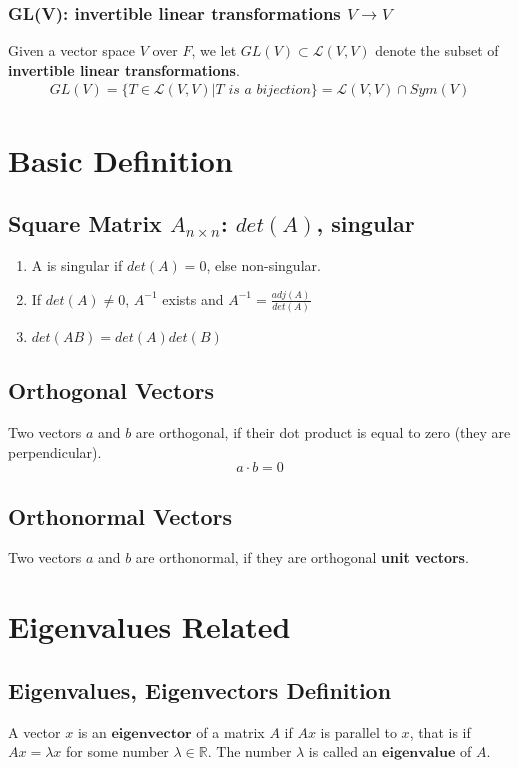 \documentclass[11pt]{elegantbook}
\begin{document}
\subsection{GL(V): invertible linear transformations $V \rightarrow	V$}
Given a vector space $V$ over $F$, we let $GL(V ) \subset \mathcal{L}(V, V )$ denote the subset of \textbf{invertible linear transformations}.
\begin{equation}
    \begin{aligned}
        GL(V)=\{T\in \mathcal{L}(V, V )| T \textit{ is a bijection}\}=\mathcal{L}(V, V )\cap Sym(V)
    \end{aligned}
    \nonumber
\end{equation}

\chapter{Basic Definition}
\section{Square Matrix $A_{n\times n}$: $det(A)$, singular}
\begin{enumerate}
    \item A is singular if $det(A)=0$, else non-singular.
    \item If $det(A)\neq 0$, $A^{-1}$ exists and $A^{-1}=\frac{adj(A)}{det(A)}$
    \item $det(AB)=det(A)det(B)$
\end{enumerate}

\section{Orthogonal Vectors}
Two vectors $a$ and $b$ are orthogonal, if their dot product is equal to zero (they are perpendicular). $$a\cdot b=0$$

\section{Orthonormal Vectors}
Two vectors $a$ and $b$ are orthonormal, if they are orthogonal \textbf{unit vectors}.





\chapter{Eigenvalues Related}
\section{Eigenvalues, Eigenvectors Definition}
A vector $x$ is an $\textbf{eigenvector}$ of a matrix $A$ if $Ax$ is parallel to $x$, that is if $Ax = \lambda x$ for some number $\lambda\in \mathbb{R}$. The number $\lambda$ is called an $\textbf{eigenvalue}$ of $A$.
\end{document}
